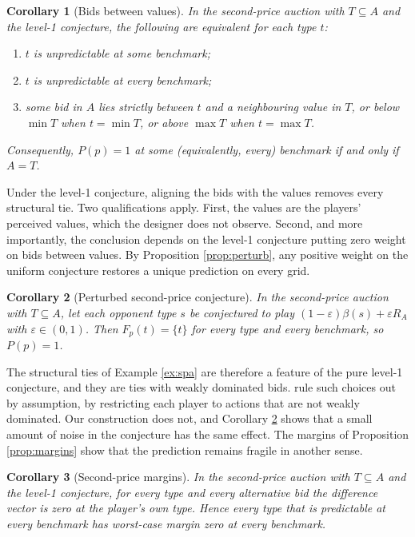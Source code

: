 \documentclass[12pt]{article}
\newtheorem{corollary}{Corollary}
\theoremstyle{definition}
\begin{document}
\begin{corollary}[Bids between values]\label{th:gaps}
In the second-price auction with $T \subseteq A$ and the level-1 conjecture, the following are equivalent for each type $t$:
\begin{enumerate}
\item[(i)] $t$ is unpredictable at some benchmark;
\item[(ii)] $t$ is unpredictable at every benchmark;
\item[(iii)] some bid in $A$ lies strictly between $t$ and a neighbouring value in $T$, or below $\min T$ when $t = \min T$, or above $\max T$ when $t = \max T$.
\end{enumerate}
Consequently, $P(p) = 1$ at some (equivalently, every) benchmark if and only if $A = T$.
\end{corollary}

Under the level-1 conjecture, aligning the bids with the values removes every structural tie. Two qualifications apply. First, the values are the players' perceived values, which the designer does not observe. Second, and more importantly, the conclusion depends on the level-1 conjecture putting zero weight on bids between values. By Proposition \ref{prop:perturb}, any positive weight on the uniform conjecture restores a unique prediction on every grid.

\begin{corollary}[Perturbed second-price conjecture]\label{cor:spaperturb}
In the second-price auction with $T \subseteq A$, let each opponent type $s$ be conjectured to play $(1-\varepsilon)\beta(s) + \varepsilon R_A$ with $\varepsilon \in (0,1)$. Then $F_p(t) = \{t\}$ for every type and every benchmark, so $P(p) = 1$.
\end{corollary}

The structural ties of Example \ref{ex:spa} are therefore a feature of the pure level-1 conjecture, and they are ties with weakly dominated bids. \citet{borgersli2019strategically} rule such choices out by assumption, by restricting each player to actions that are not weakly dominated. Our construction does not, and Corollary \ref{cor:spaperturb} shows that a small amount of noise in the conjecture has the same effect. The margins of Proposition \ref{prop:margins} show that the prediction remains fragile in another sense.

\begin{corollary}[Second-price margins]\label{cor:spamargins}
In the second-price auction with $T \subseteq A$ and the level-1 conjecture, for every type and every alternative bid the difference vector is zero at the player's own type. Hence every type that is predictable at every benchmark has worst-case margin zero at every benchmark.
\end{corollary}
\end{document}
